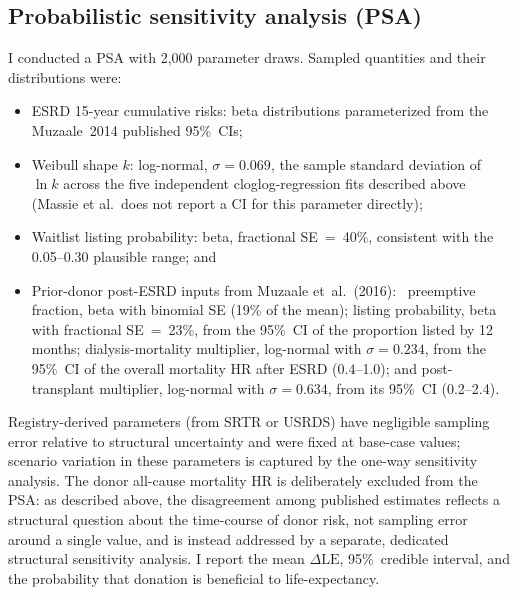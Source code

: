 \subsection{Probabilistic sensitivity analysis (PSA)}
\label{sec:methods-psa}
I conducted a PSA with 2,000 parameter draws. Sampled quantities and their distributions were:
\begin{itemize}
	\item ESRD 15-year cumulative risks: beta distributions parameterized from the Muzaale~2014 published 95\%~CIs;\cite{muzaale_risk_2014}
	\item Weibull shape $k$: log-normal, $\sigma = 0.069$, the sample standard deviation of $\ln k$ across the five independent cloglog-regression fits described above (Massie et al.\ does not report a CI for this parameter directly);
	\item Waitlist listing probability: beta, fractional SE~=~40\%, consistent with the 0.05--0.30 plausible range; and
	\item Prior-donor post-ESRD inputs from Muzaale et~al.~(2016):~\cite{muzaale2016outcomes} preemptive fraction, beta with binomial SE (19\% of the mean); listing probability, beta with fractional SE~=~23\%, from the 95\%~CI of the proportion listed by 12 months; dialysis-mortality multiplier, log-normal with $\sigma = 0.234$, from the 95\%~CI of the overall mortality HR after ESRD (0.4--1.0); and post-transplant multiplier, log-normal with $\sigma = 0.634$, from its 95\%~CI (0.2--2.4).
\end{itemize}
Registry-derived parameters (from SRTR or USRDS) have negligible sampling error relative to structural uncertainty and were fixed at base-case values; scenario variation in these parameters is captured by the one-way sensitivity analysis. The donor all-cause mortality HR is deliberately excluded from the PSA: as described above, the disagreement among published estimates reflects a structural question about the time-course of donor risk, not sampling error around a single value, and is instead addressed by a separate, dedicated structural sensitivity analysis. I report the mean $\Delta\text{LE}$, 95\%~credible interval, and the probability that donation is beneficial to life-expectancy.

